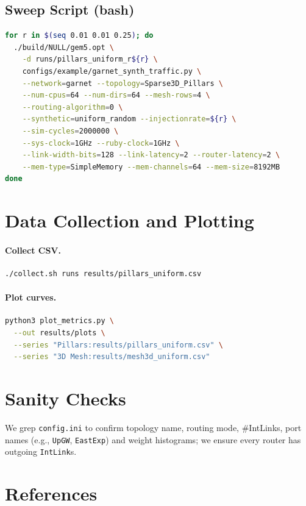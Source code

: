 \documentclass[11pt]{article}
\begin{document}
\subsection*{Sweep Script (bash)}
\begin{lstlisting}[language=bash]
for r in $(seq 0.01 0.01 0.25); do
  ./build/NULL/gem5.opt \
    -d runs/pillars_uniform_r${r} \
    configs/example/garnet_synth_traffic.py \
    --network=garnet --topology=Sparse3D_Pillars \
    --num-cpus=64 --num-dirs=64 --mesh-rows=4 \
    --routing-algorithm=0 \
    --synthetic=uniform_random --injectionrate=${r} \
    --sim-cycles=2000000 \
    --sys-clock=1GHz --ruby-clock=1GHz \
    --link-width-bits=128 --link-latency=2 --router-latency=2 \
    --mem-type=SimpleMemory --mem-channels=64 --mem-size=8192MB
done
\end{lstlisting}

\section{Data Collection and Plotting}
\label{sec:repro}
\paragraph{Collect CSV.}
\begin{lstlisting}[language=bash]
./collect.sh runs results/pillars_uniform.csv
\end{lstlisting}

\paragraph{Plot curves.}
\begin{lstlisting}[language=bash]
python3 plot_metrics.py \
  --out results/plots \
  --series "Pillars:results/pillars_uniform.csv" \
  --series "3D Mesh:results/mesh3d_uniform.csv"
\end{lstlisting}

\section{Sanity Checks}
We grep \texttt{config.ini} to confirm topology name, routing mode, \#IntLinks, port names (e.g., \texttt{UpGW}, \texttt{EastExp}) and weight histograms; we ensure every router has outgoing \texttt{IntLink}s.

\section*{References}


\end{document}
